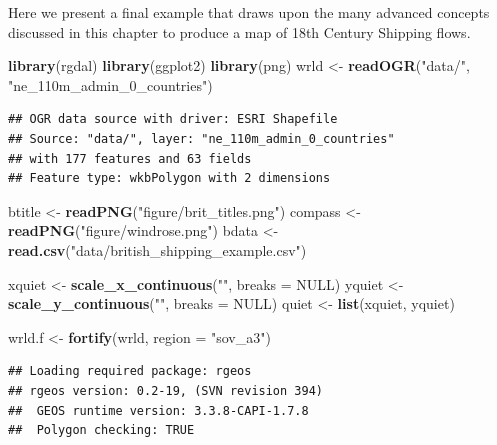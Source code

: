 \documentclass[]{article}
\newenvironment{Shaded}{}{}
\newcommand{\KeywordTok}[1]{\textcolor[rgb]{0.00,0.44,0.13}{\textbf{{#1}}}}
\newcommand{\DataTypeTok}[1]{\textcolor[rgb]{0.56,0.13,0.00}{{#1}}}
\newcommand{\StringTok}[1]{\textcolor[rgb]{0.25,0.44,0.63}{{#1}}}
\newcommand{\OtherTok}[1]{\textcolor[rgb]{0.00,0.44,0.13}{{#1}}}
\newcommand{\NormalTok}[1]{{#1}}
\begin{document}
Here we present a final example that draws upon the many advanced
concepts discussed in this chapter to produce a map of 18th Century
Shipping flows.

\begin{Shaded}
\begin{Highlighting}[]
\KeywordTok{library}\NormalTok{(rgdal)}
\KeywordTok{library}\NormalTok{(ggplot2)}
\KeywordTok{library}\NormalTok{(png)}
\NormalTok{wrld <- }\KeywordTok{readOGR}\NormalTok{(}\StringTok{"data/"}\NormalTok{, }\StringTok{"ne_110m_admin_0_countries"}\NormalTok{)}
\end{Highlighting}
\end{Shaded}
\begin{verbatim}
## OGR data source with driver: ESRI Shapefile 
## Source: "data/", layer: "ne_110m_admin_0_countries"
## with 177 features and 63 fields
## Feature type: wkbPolygon with 2 dimensions
\end{verbatim}
\begin{Shaded}
\begin{Highlighting}[]
\NormalTok{btitle <- }\KeywordTok{readPNG}\NormalTok{(}\StringTok{"figure/brit_titles.png"}\NormalTok{)}
\NormalTok{compass <- }\KeywordTok{readPNG}\NormalTok{(}\StringTok{"figure/windrose.png"}\NormalTok{)}
\NormalTok{bdata <- }\KeywordTok{read.csv}\NormalTok{(}\StringTok{"data/british_shipping_example.csv"}\NormalTok{)}
\end{Highlighting}
\end{Shaded}
\begin{Shaded}
\begin{Highlighting}[]
\NormalTok{xquiet <- }\KeywordTok{scale_x_continuous}\NormalTok{(}\StringTok{""}\NormalTok{, }\DataTypeTok{breaks =} \OtherTok{NULL}\NormalTok{)}
\NormalTok{yquiet <- }\KeywordTok{scale_y_continuous}\NormalTok{(}\StringTok{""}\NormalTok{, }\DataTypeTok{breaks =} \OtherTok{NULL}\NormalTok{)}
\NormalTok{quiet <- }\KeywordTok{list}\NormalTok{(xquiet, yquiet)}
\end{Highlighting}
\end{Shaded}
\begin{Shaded}
\begin{Highlighting}[]
\NormalTok{wrld.f <- }\KeywordTok{fortify}\NormalTok{(wrld, }\DataTypeTok{region =} \StringTok{"sov_a3"}\NormalTok{)}
\end{Highlighting}
\end{Shaded}
\begin{verbatim}
## Loading required package: rgeos
## rgeos version: 0.2-19, (SVN revision 394)
##  GEOS runtime version: 3.3.8-CAPI-1.7.8 
##  Polygon checking: TRUE
\end{verbatim}
\end{document}
